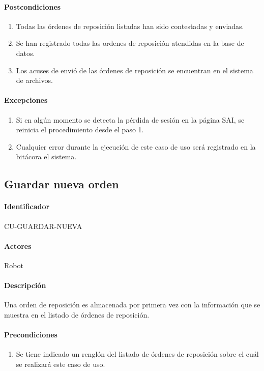 \paragraph{Postcondiciones}
\begin{enumerate}
  \item Todas las órdenes de reposición listadas han sido contestadas y enviadas.
  \item Se han registrado todas las ordenes de reposición atendidas en la base de datos.
  \item Los acuses de envió de las órdenes de reposición se encuentran en el sistema de archivos.
\end{enumerate}
\paragraph{Excepciones}
\begin{enumerate}
  \item Si en algún momento se detecta la pérdida de sesión en la página SAI, se reinicia el procedimiento desde el paso 1.
  \item Cualquier error durante la ejecución de este caso de uso será registrado en la bitácora el sistema.
\end{enumerate}


\subsection{Guardar nueva orden}
\paragraph{Identificador}
CU-GUARDAR-NUEVA
\paragraph{Actores}
Robot
\paragraph{Descripción}
Una orden de reposición es almacenada por primera vez con la información que se muestra en el listado de órdenes de reposición.
\paragraph{Precondiciones}
\begin{enumerate}
  \item Se tiene indicado un renglón del listado de órdenes de reposición sobre el cuál se realizará este caso de uso.
\end{enumerate}
